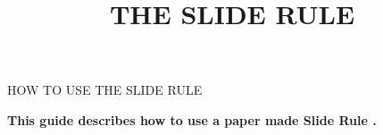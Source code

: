 
\usepackage{background}
\usetikzlibrary{calc}
\usepackage{fixltx2e}
\usepackage{unicode-math}
\usepackage{fancybox}
\usepackage{amsmath}
\usepackage{graphicx}
\usepackage{tabularx}


\newcommand{\makefulltitle}{How To Use The Slide Rule }
\newcommand{\tabstockupper}{Upper half of the Stock }
\newcommand{\tabslidefront}{Front side of the Slide }
\newcommand{\tabslideback}{Reverse side of the Slide }
\newcommand{\tabstocklower}{Lower half of the Stock }



\title{\fontsize{60}{60}\selectfont THE SLIDE RULE}
\preauthor{}\postauthor{}\author{}
\predate{}\postdate{}\date{}
\everymath{\displaystyle}


  \begin{center}
    \headingfont\fontsize{28}{28}\selectfont HOW TO USE THE SLIDE RULE
  \end{center}

  \nosection{}
  \large\textbf{\makeperex This guide describes how to use a paper made Slide Rule \modelname.}

